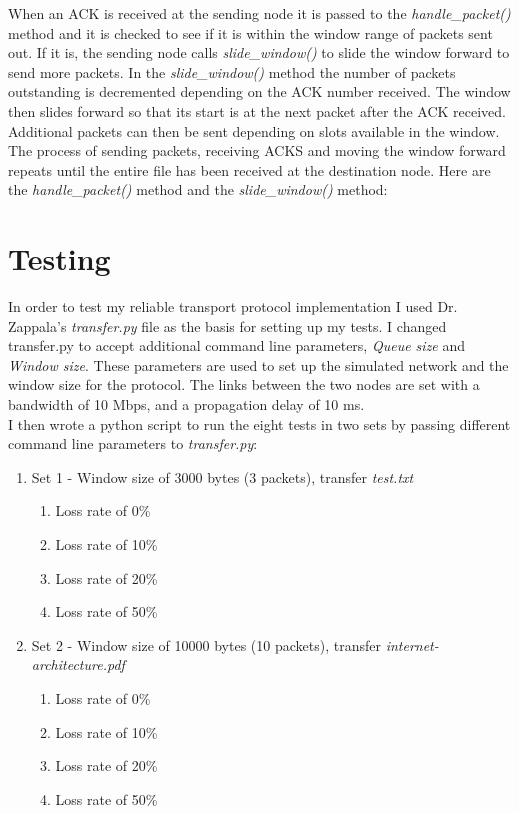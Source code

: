 \documentclass[11pt]{article}
\begin{document}
When an ACK is received at the sending node it is passed to the \textit{handle\_packet()} method and it is checked to see if it is within the window range of packets sent out. If it is, the sending node calls \textit{slide\_window()} to slide the window forward to send more packets. In the \textit{slide\_window()} method the number of packets outstanding is decremented depending on the ACK number received. The window then slides forward so that its start is at the next packet after the ACK received. Additional packets can then be sent depending on slots available in the window. The process of sending packets, receiving ACKS and moving the window forward repeats until the entire file has been received at the destination node. Here are the \textit{handle\_packet()} method and the \textit{slide\_window()} method:


\vspace{0.25cm}


\vspace{0.25cm}

\section{Testing}

In order to test my reliable transport protocol implementation I used Dr. Zappala's \textit{transfer.py} file as the basis for setting up my tests. I changed transfer.py to accept additional command line parameters, \textit{Queue size} and \textit{Window size}. These parameters are used to set up the simulated network and the window size for the protocol. The links between the two nodes are set with a bandwidth of 10 Mbps, and a propagation delay of 10 ms.\\

I then wrote a python script to run the eight tests in two sets by passing different command line parameters to \textit{transfer.py}:
\begin{enumerate}
  \item Set 1 - Window size of 3000 bytes (3 packets), transfer \textit{test.txt}
  \begin{enumerate}
    \item Loss rate of 0\%
    \item Loss rate of 10\%
    \item Loss rate of 20\%
    \item Loss rate of 50\%
  \end{enumerate}
  \item Set 2 - Window size of 10000 bytes (10 packets), transfer \textit{internet-architecture.pdf}
  \begin{enumerate}
    \item Loss rate of 0\%
    \item Loss rate of 10\%
    \item Loss rate of 20\%
    \item Loss rate of 50\%
  \end{enumerate}
\end{enumerate}
\end{document}

